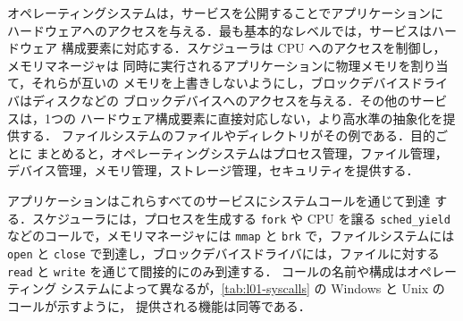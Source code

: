 \documentclass[../main.tex]{subfiles}
\begin{document}
オペレーティングシステムは，サービスを公開することでアプリケーションに
ハードウェアへのアクセスを与える．最も基本的なレベルでは，サービスはハードウェア
構成要素に対応する．スケジューラは CPU へのアクセスを制御し，メモリマネージャは
同時に実行されるアプリケーションに物理メモリを割り当て，それらが互いの
メモリを上書きしないようにし，ブロックデバイスドライバはディスクなどの
ブロックデバイスへのアクセスを与える．その他のサービスは，1つの
ハードウェア構成要素に直接対応しない，より高水準の抽象化を提供する．
ファイルシステムのファイルやディレクトリがその例である．目的ごとに
まとめると，オペレーティングシステムはプロセス管理，ファイル管理，
デバイス管理，メモリ管理，ストレージ管理，セキュリティを提供する．%

アプリケーションはこれらすべてのサービスにシステムコールを通じて到達
する．スケジューラには，プロセスを生成する \texttt{fork} や CPU を譲る
\texttt{sched\_yield} などのコールで，メモリマネージャには
\texttt{mmap} と \texttt{brk} で，ファイルシステムには \texttt{open} と
\texttt{close} で到達し，ブロックデバイスドライバには，ファイルに対する
\texttt{read} と \texttt{write} を通じて間接的にのみ到達する．%
コールの名前や構成はオペレーティング
システムによって異なるが，\cref{tab:l01-syscalls} の Windows と Unix の
コールが示すように，
提供される機能は同等である．
\end{document}
